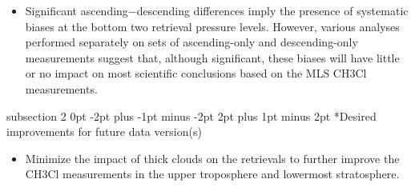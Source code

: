 \documentclass[11pt,draft]{report}
\makeatletter
\renewcommand{\subsection}{\@startsection%
  {subsection}%
  {2}%
  {0pt}%
  {-2pt plus -1pt minus -2pt}%
  {2pt plus 1pt minus 2pt}%
  {\large\sffamily\fontseries{sb}\selectfont\flushleft\color{SectionColor}\figureversion{tabular}}}%
\makeatother
\begin{document}
\begin{itemize}
\item Significant ascending$-$descending differences imply the
  presence of systematic biases at the bottom two retrieval pressure
  levels.  However, various analyses performed separately on sets of
  ascending-only and descending-only measurements suggest that,
  although significant, these biases will have little or no impact on
  most scientific conclusions based on the MLS CH\cs3Cl measurements.
\end{itemize}

\subsection*{Desired improvements for future data version(s)}

\begin{itemize}
\item Minimize the impact of thick clouds on the retrievals to further
  improve the CH\cs3Cl measurements in the upper troposphere and
  lowermost stratosphere.
\end{itemize}
\end{document}
